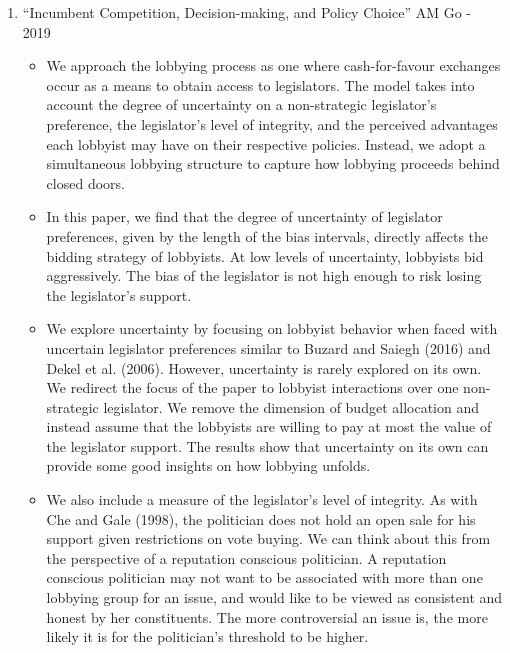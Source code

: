 \documentclass[a4paper,12pt]{article}
\begin{document}
\begin{enumerate}
\newpage


\item “Incumbent Competition, Decision-making, and Policy Choice” AM Go - 2019   

\begin{itemize}
\item We approach the lobbying process as one where cash-for-favour exchanges occur as a means to obtain access to legislators. The model takes into account the degree of uncertainty on a non-strategic legislator’s preference, the legislator’s level of integrity, and the perceived advantages each lobbyist may have on their respective policies. Instead, we adopt a simultaneous lobbying structure to capture how lobbying proceeds behind closed doors.
\item In this paper, we find that the degree of uncertainty of legislator preferences, given by the length of the bias intervals, directly affects the bidding strategy of lobbyists. At low levels of uncertainty, lobbyists bid aggressively. The bias of the legislator is not high enough to risk losing the legislator’s support. 
\item We explore uncertainty by focusing on lobbyist behavior when faced with uncertain legislator preferences similar to Buzard and Saiegh (2016) and Dekel et al. (2006).  However, uncertainty is rarely explored on its own. We redirect the focus of the paper to lobbyist interactions over one non-strategic legislator. We remove the dimension of budget allocation and instead assume that the lobbyists are willing to pay at most the value of the legislator support. The results show that uncertainty on its own can provide some good insights on how lobbying unfolds. 
\item We also include a measure of the legislator’s level of integrity. As with Che and Gale (1998), the politician does not hold an open sale for his support given restrictions on vote buying. We can think about this from the perspective of a reputation conscious politician. A reputation conscious politician may not want to be associated with more than one lobbying group for an issue, and would like to be viewed as consistent and honest by her constituents. The more controversial an issue is, the more likely it is for the politician’s threshold to be higher. 

\end{itemize}

\newpage





\end{enumerate}
\end{document}
